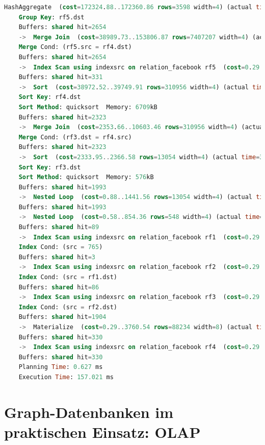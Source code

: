 \begin{lstlisting}[language=SQL,caption = Ausführungsplan INNER JOIN,frame=single, label={2.AusführungsplanINNERJOIN.listing} ]
    HashAggregate  (cost=172324.88..172360.86 rows=3598 width=4) (actual time=156.786..156.823 rows=317 loops=1)
    Group Key: rf5.dst
    Buffers: shared hit=2654
    ->  Merge Join  (cost=38989.73..153806.87 rows=7407207 width=4) (actual time=33.728..105.213 rows=572149 loops=1)
    Merge Cond: (rf5.src = rf4.dst)
    Buffers: shared hit=2654
    ->  Index Scan using indexsrc on relation_facebook rf5  (cost=0.29..3539.96 rows=88234 width=8) (actual time=0.004..3.466 rows=33654 loops=1)
    Buffers: shared hit=331
    ->  Sort  (cost=38972.52..39749.91 rows=310956 width=4) (actual time=30.171..50.861 rows=579169 loops=1)
    Sort Key: rf4.dst
    Sort Method: quicksort  Memory: 6709kB
    Buffers: shared hit=2323
    ->  Merge Join  (cost=2353.66..10603.46 rows=310956 width=4) (actual time=9.093..21.946 rows=77587 loops=1)
    Merge Cond: (rf3.dst = rf4.src)
    Buffers: shared hit=2323
    ->  Sort  (cost=2333.95..2366.58 rows=13054 width=4) (actual time=3.176..3.593 rows=8177 loops=1)
    Sort Key: rf3.dst
    Sort Method: quicksort  Memory: 576kB
    Buffers: shared hit=1993
    ->  Nested Loop  (cost=0.88..1441.56 rows=13054 width=4) (actual time=0.012..2.289 rows=8177 loops=1)
    Buffers: shared hit=1993
    ->  Nested Loop  (cost=0.58..854.36 rows=548 width=4) (actual time=0.009..0.156 rows=629 loops=1)
    Buffers: shared hit=89
    ->  Index Scan using indexsrc on relation_facebook rf1  (cost=0.29..44.00 rows=23 width=4) (actual time=0.004..0.008 rows=27 loops=1)
    Index Cond: (src = 765)
    Buffers: shared hit=3
    ->  Index Scan using indexsrc on relation_facebook rf2  (cost=0.29..34.96 rows=27 width=8) (actual time=0.001..0.003 rows=23 loops=27)
    Index Cond: (src = rf1.dst)
    Buffers: shared hit=86
    ->  Index Scan using indexsrc on relation_facebook rf3  (cost=0.29..0.80 rows=27 width=8) (actual time=0.001..0.002 rows=13 loops=629)
    Index Cond: (src = rf2.dst)
    Buffers: shared hit=1904
    ->  Materialize  (cost=0.29..3760.54 rows=88234 width=8) (actual time=0.004..8.301 rows=109531 loops=1)
    Buffers: shared hit=330
    ->  Index Scan using indexsrc on relation_facebook rf4  (cost=0.29..3539.96 rows=88234 width=8) (actual time=0.003..3.863 rows=33653 loops=1)
    Buffers: shared hit=330
    Planning Time: 0.627 ms
    Execution Time: 157.021 ms

\end{lstlisting}

\section{Graph-Datenbanken im praktischen Einsatz: OLAP}

